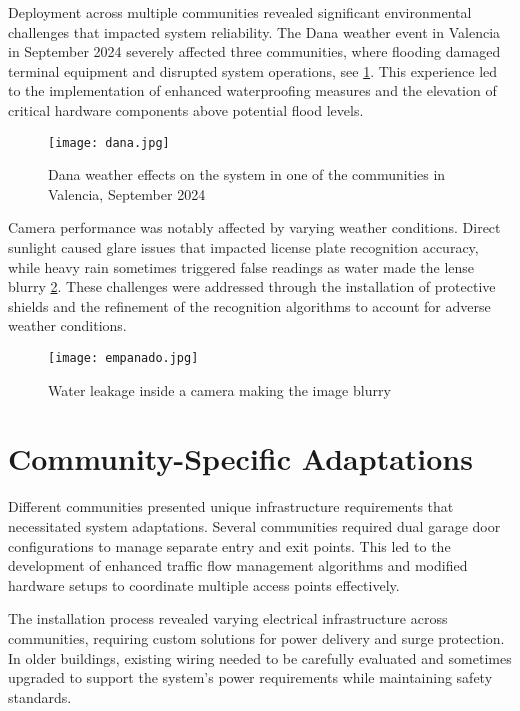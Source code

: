 Deployment across multiple communities revealed significant environmental challenges that impacted system reliability. The Dana weather event in Valencia in September 2024 \autocite{CNNSpainFlooding2024} severely affected three communities, where flooding damaged terminal equipment and disrupted system operations, see \cref{fig:dana}. This experience led to the implementation of enhanced waterproofing measures and the elevation of critical hardware components above potential flood levels. 

\begin{figure}
        \texttt{[image: dana.jpg]}
    \caption{Dana weather effects on the system in one of the communities in Valencia, September 2024}\label{fig:dana}
\end{figure}

Camera performance was notably affected by varying weather conditions. Direct sunlight caused glare issues that impacted license plate recognition accuracy, while heavy rain sometimes triggered false readings as water made the lense blurry \cref{fig:wet_camera}. These challenges were addressed through the installation of protective shields and the refinement of the recognition algorithms to account for adverse weather conditions. 

\begin{figure}
        \texttt{[image: empanado.jpg]}
    \caption{Water leakage inside a camera making the image blurry}\label{fig:wet_camera}
\end{figure}

\section{Community-Specific Adaptations}

Different communities presented unique infrastructure requirements that necessitated system adaptations. Several communities required dual garage door configurations to manage separate entry and exit points. This led to the development of enhanced traffic flow management algorithms and modified hardware setups to coordinate multiple access points effectively. 

The installation process revealed varying electrical infrastructure across communities, requiring custom solutions for power delivery and surge protection. In older buildings, existing wiring needed to be carefully evaluated and sometimes upgraded to support the system's power requirements while maintaining safety standards.


